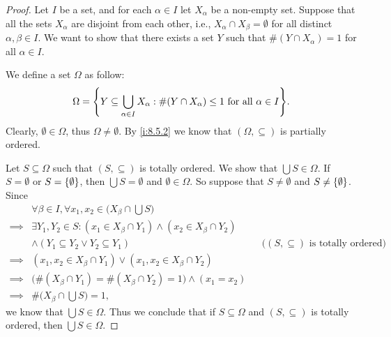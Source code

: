 \begin{proof}
  Let \(I\) be a set, and for each \(\alpha \in I\) let \(X_{\alpha}\) be a non-empty set.
  Suppose that all the sets \(X_{\alpha}\) are disjoint from each other, i.e., \(X_{\alpha} \cap X_{\beta} = \emptyset\) for all distinct \(\alpha, \beta \in I\).
  We want to show that there exists a set \(Y\) such that \(\#(Y \cap X_{\alpha}) = 1\) for all \(\alpha \in I\).

  We define a set \(\Omega\) as follow:
  \[
    \Omega = \set{Y \subseteq \bigcup_{\alpha \in I} X_{\alpha} : \#(Y \cap X_{\alpha}) \leq 1 \text{ for all } \alpha \in I}.
  \]
  Clearly, \(\emptyset \in \Omega\), thus \(\Omega \neq \emptyset\).
  By \cref{i:8.5.2} we know that \((\Omega, \subseteq)\) is partially ordered.

  Let \(S \subseteq \Omega\) such that \((S, \subseteq)\) is totally ordered.
  We show that \(\bigcup S \in \Omega\).
  If \(S = \emptyset\) or \(S = \left\lbrace\emptyset\right\rbrace\), then \(\bigcup S = \emptyset\) and \(\emptyset \in \Omega\).
  So suppose that \(S \neq \emptyset\) and \(S \neq \left\lbrace\emptyset\right\rbrace\).
  Since
  \begin{align*}
             & \forall \beta \in I, \forall x_1, x_2 \in \Big(X_{\beta} \cap \bigcup S\Big)                                                                 \\
    \implies & \exists Y_1, Y_2 \in S : (x_1 \in X_{\beta} \cap Y_1) \land (x_2 \in X_{\beta} \cap Y_2)                                                     \\
             & \land (Y_1 \subseteq Y_2 \lor Y_2 \subseteq Y_1)                                         &  & \text{(\((S, \subseteq)\) is totally ordered)} \\
    \implies & (x_1, x_2 \in X_{\beta} \cap Y_1) \lor (x_1, x_2 \in X_{\beta} \cap Y_2)                                                                     \\
    \implies & \big(\#(X_{\beta} \cap Y_1) = \#(X_{\beta} \cap Y_2) = 1\big) \land (x_1 = x_2)                                                              \\
    \implies & \#\Big(X_{\beta} \cap \bigcup S\Big) = 1,
  \end{align*}
  we know that \(\bigcup S \in \Omega\).
  Thus we conclude that if \(S \subseteq \Omega\) and \((S, \subseteq)\) is totally ordered, then \(\bigcup S \in \Omega\).


\end{proof}

